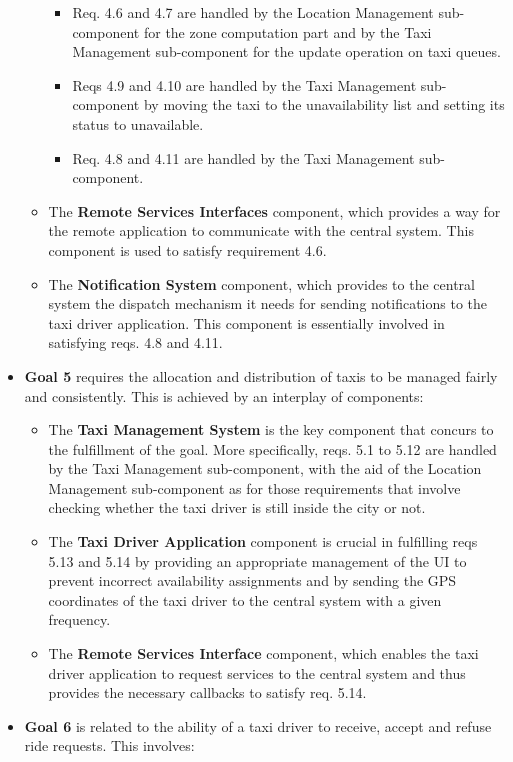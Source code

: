 \begin{itemize}
\begin{itemize}
	\begin{itemize}
	\item Req. 4.6 and 4.7 are handled by the Location Management sub-component for the zone computation part and by the Taxi Management sub-component for the update operation on taxi queues.
	\item Reqs 4.9 and 4.10 are handled by the Taxi Management sub-component by moving the taxi to the unavailability list and setting its status to unavailable.
	\item Req. 4.8 and 4.11 are handled by the Taxi Management sub-component.
	\end{itemize}
	\item The \textbf{Remote Services Interfaces} component, which provides a way for the remote application to communicate with the central system. This component is used to satisfy requirement 4.6.
	\item The \textbf{Notification System} component, which provides to the central system the dispatch mechanism it needs for sending notifications to the taxi driver application. This component is essentially involved in satisfying reqs. 4.8 and 4.11.
	\end{itemize}
	\item \textbf{Goal 5} requires the allocation and distribution of taxis to be managed fairly and consistently. This is achieved by an interplay of components: 
	\begin{itemize}
	\item The \textbf{Taxi Management System} is the key component that concurs to the fulfillment of the goal. More specifically, reqs. 5.1 to 5.12 are handled by the Taxi Management sub-component, with the aid of the Location Management sub-component as for those requirements that involve checking whether the taxi driver is still inside the city or not. 
	\item The \textbf{Taxi Driver Application} component is crucial in fulfilling reqs 5.13 and 5.14 by providing an appropriate management of the UI to prevent incorrect availability assignments and by sending the GPS coordinates of the taxi driver to the central system with a given frequency.
	\item The \textbf{Remote Services Interface} component, which enables the taxi driver application to request services to the central system and thus provides the necessary callbacks to satisfy req. 5.14. 	
	\end{itemize}
	\item \textbf{Goal 6} is related to the ability of a taxi driver to receive, accept and refuse ride requests. This involves:

\end{itemize}
